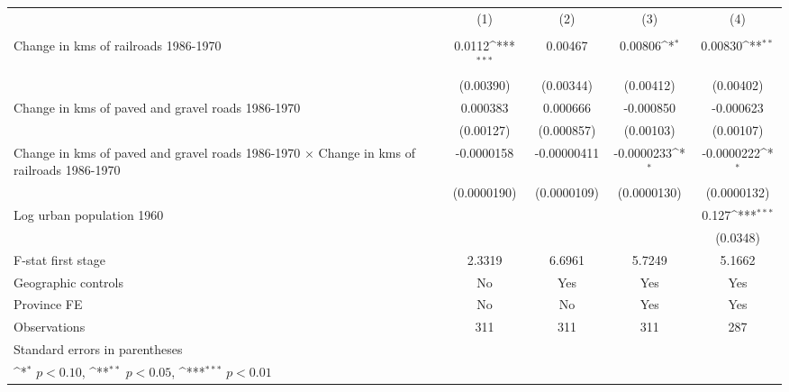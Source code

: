 {
\def\sym#1{\ifmmode^{#1}\else\(^{#1}\)\fi}
\begin{tabular}{l*{4}{c}}
\hline\hline
                &\multicolumn{1}{c}{(1)}&\multicolumn{1}{c}{(2)}&\multicolumn{1}{c}{(3)}&\multicolumn{1}{c}{(4)}\\
                &\multicolumn{1}{c}{}&\multicolumn{1}{c}{}&\multicolumn{1}{c}{}&\multicolumn{1}{c}{}\\
\hline
Change in kms of railroads 1986-1970&   0.0112\sym{***}&  0.00467         &  0.00806\sym{*}  &  0.00830\sym{**} \\
                &(0.00390)         &(0.00344)         &(0.00412)         &(0.00402)         \\
[1em]
Change in kms of paved and gravel roads 1986-1970& 0.000383         & 0.000666         &-0.000850         &-0.000623         \\
                &(0.00127)         &(0.000857)         &(0.00103)         &(0.00107)         \\
[1em]
Change in kms of paved and gravel roads 1986-1970 $\times$ Change in kms of railroads 1986-1970&-0.0000158         &-0.00000411         &-0.0000233\sym{*}  &-0.0000222\sym{*}  \\
                &(0.0000190)         &(0.0000109)         &(0.0000130)         &(0.0000132)         \\
[1em]
Log urban population 1960&                  &                  &                  &    0.127\sym{***}\\
                &                  &                  &                  & (0.0348)         \\
\hline
F-stat first stage&   2.3319         &   6.6961         &   5.7249         &   5.1662         \\
Geographic controls&       No         &      Yes         &      Yes         &      Yes         \\
Province FE     &       No         &       No         &      Yes         &      Yes         \\
Observations    &      311         &      311         &      311         &      287         \\
\hline\hline
\multicolumn{5}{l}{\footnotesize Standard errors in parentheses}\\
\multicolumn{5}{l}{\footnotesize \sym{*} \(p<0.10\), \sym{**} \(p<0.05\), \sym{***} \(p<0.01\)}\\
\end{tabular}
}
